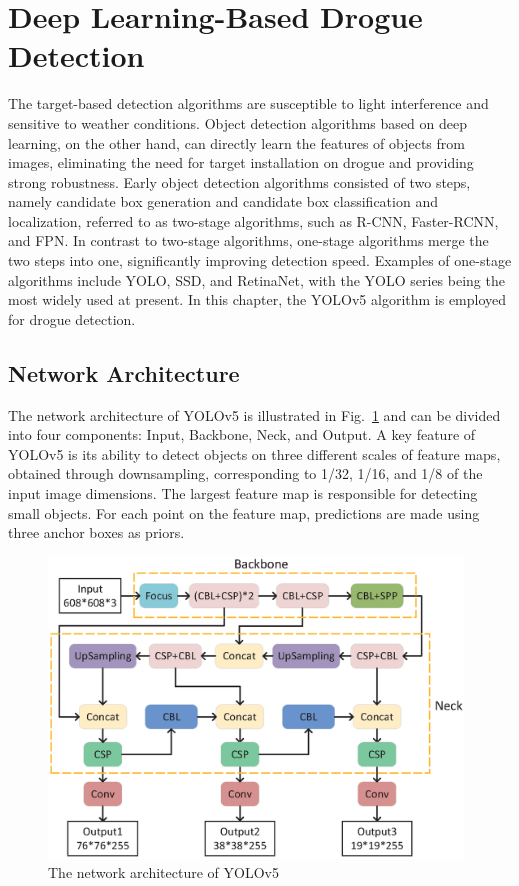 \section{Deep Learning-Based Drogue Detection}

The target-based detection algorithms are susceptible to light interference and sensitive to weather conditions. Object detection algorithms based on deep learning, on the other hand, can directly learn the features of objects from images, eliminating the need for target installation on drogue and providing strong robustness. Early object detection algorithms consisted of two steps, namely candidate box generation and candidate box classification and localization, referred to as two-stage algorithms, such as R-CNN\cite{girshick2014rich}, Faster-RCNN\cite{ren2015faster}, and FPN\cite{lin2017feature}. In contrast to two-stage algorithms, one-stage algorithms merge the two steps into one, significantly improving detection speed. Examples of one-stage algorithms include YOLO\cite{redmon2016you}, SSD\cite{fu2017dssd}, and RetinaNet\cite{lin2017focal}, with the YOLO series being the most widely used at present. In this chapter, the YOLOv5 algorithm is employed for drogue detection.

\subsection{Network Architecture}

The network architecture of YOLOv5 is illustrated in Fig.~\ref{YOLO-network} and can be divided into four components: Input, Backbone, Neck, and Output. A key feature of YOLOv5 is its ability to detect objects on three different scales of feature maps, obtained through downsampling, corresponding to 1/32, 1/16, and 1/8 of the input image dimensions. The largest feature map is responsible for detecting small objects. For each point on the feature map, predictions are made using three anchor boxes as priors.

\begin{figure}[!htb]
	\centering
	\includegraphics[width=11cm]{Figures/Figs_Ch6/YOLO-network.eps}
	\caption{The network architecture of YOLOv5}
	\label{YOLO-network}
\end{figure}

